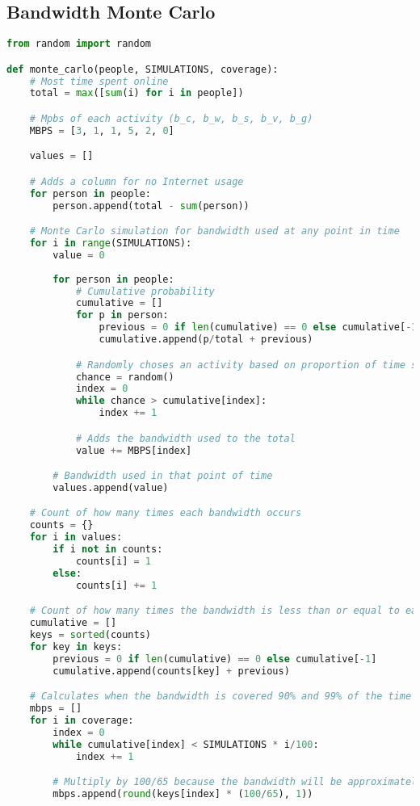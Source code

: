 \documentclass[12pt]{article}
\begin{document}
\subsection{Bandwidth Monte Carlo}
\begin{lstlisting}[language=Python]
from random import random

def monte_carlo(people, SIMULATIONS, coverage):
    # Most time spent online
    total = max([sum(i) for i in people])

    # Mpbs of each activity (b_c, b_w, b_s, b_v, b_g)
    MBPS = [3, 1, 1, 5, 2, 0]

    values = []

    # Adds a column for no Internet usage
    for person in people:
        person.append(total - sum(person))

    # Monte Carlo simulation for bandwidth used at any point in time
    for i in range(SIMULATIONS):
        value = 0
        
        for person in people:
            # Cumulative probability
            cumulative = []
            for p in person:
                previous = 0 if len(cumulative) == 0 else cumulative[-1]
                cumulative.append(p/total + previous)

            # Randomly choses an activity based on proportion of time spent
            chance = random()
            index = 0
            while chance > cumulative[index]:
                index += 1

            # Adds the bandwidth used to the total
            value += MBPS[index]

        # Bandwidth used in that point of time
        values.append(value)

    # Count of how many times each bandwidth occurs
    counts = {}
    for i in values:
        if i not in counts:
            counts[i] = 1
        else:
            counts[i] += 1

    # Count of how many times the bandwidth is less than or equal to each bandwidth value
    cumulative = []
    keys = sorted(counts)
    for key in keys:
        previous = 0 if len(cumulative) == 0 else cumulative[-1]
        cumulative.append(counts[key] + previous)

    # Calculates when the bandwidth is covered 90% and 99% of the time
    mbps = []
    for i in coverage:
        index = 0
        while cumulative[index] < SIMULATIONS * i/100:
            index += 1

        # Multiply by 100/65 because the bandwidth will be approximately 35% slower due to interferences
        mbps.append(round(keys[index] * (100/65), 1))


\end{lstlisting}
\end{document}
